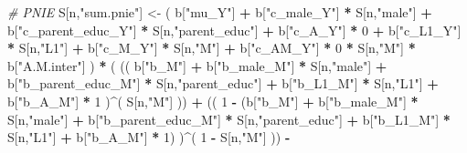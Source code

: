 \documentclass[
]{book}
\newenvironment{Shaded}{\begin{snugshade}}{\end{snugshade}}
\newcommand{\CommentTok}[1]{\textcolor[rgb]{0.56,0.35,0.01}{\textit{#1}}}
\newcommand{\DecValTok}[1]{\textcolor[rgb]{0.00,0.00,0.81}{#1}}
\newcommand{\NormalTok}[1]{#1}
\newcommand{\OtherTok}[1]{\textcolor[rgb]{0.56,0.35,0.01}{#1}}
\newcommand{\SpecialCharTok}[1]{\textcolor[rgb]{0.81,0.36,0.00}{\textbf{#1}}}
\newcommand{\StringTok}[1]{\textcolor[rgb]{0.31,0.60,0.02}{#1}}
\begin{document}
\begin{Shaded}
\begin{Highlighting}[]
    \CommentTok{\# PNIE }
\NormalTok{    S[n,}\StringTok{"sum.pnie"}\NormalTok{] }\OtherTok{\textless{}{-}}\NormalTok{ ( b[}\StringTok{"mu\_Y"}\NormalTok{] }\SpecialCharTok{+} 
\NormalTok{                           b[}\StringTok{"c\_male\_Y"}\NormalTok{] }\SpecialCharTok{*}\NormalTok{ S[n,}\StringTok{"male"}\NormalTok{] }\SpecialCharTok{+} 
\NormalTok{                           b[}\StringTok{"c\_parent\_educ\_Y"}\NormalTok{] }\SpecialCharTok{*}\NormalTok{ S[n,}\StringTok{"parent\_educ"}\NormalTok{] }\SpecialCharTok{+} 
\NormalTok{                           b[}\StringTok{"c\_A\_Y"}\NormalTok{] }\SpecialCharTok{*} \DecValTok{0} \SpecialCharTok{+} 
\NormalTok{                           b[}\StringTok{"c\_L1\_Y"}\NormalTok{] }\SpecialCharTok{*}\NormalTok{ S[n,}\StringTok{"L1"}\NormalTok{] }\SpecialCharTok{+}
\NormalTok{                           b[}\StringTok{"c\_M\_Y"}\NormalTok{] }\SpecialCharTok{*}\NormalTok{ S[n,}\StringTok{"M"}\NormalTok{] }\SpecialCharTok{+}
\NormalTok{                           b[}\StringTok{"c\_AM\_Y"}\NormalTok{] }\SpecialCharTok{*} \DecValTok{0} \SpecialCharTok{*}\NormalTok{ S[n,}\StringTok{"M"}\NormalTok{] }\SpecialCharTok{*}\NormalTok{ b[}\StringTok{"A.M.inter"}\NormalTok{] ) }\SpecialCharTok{*}
\NormalTok{      ( (( b[}\StringTok{"b\_M"}\NormalTok{] }\SpecialCharTok{+} 
\NormalTok{             b[}\StringTok{"b\_male\_M"}\NormalTok{] }\SpecialCharTok{*}\NormalTok{ S[n,}\StringTok{"male"}\NormalTok{] }\SpecialCharTok{+} 
\NormalTok{             b[}\StringTok{"b\_parent\_educ\_M"}\NormalTok{] }\SpecialCharTok{*}\NormalTok{ S[n,}\StringTok{"parent\_educ"}\NormalTok{] }\SpecialCharTok{+} 
\NormalTok{             b[}\StringTok{"b\_L1\_M"}\NormalTok{] }\SpecialCharTok{*}\NormalTok{ S[n,}\StringTok{"L1"}\NormalTok{] }\SpecialCharTok{+}
\NormalTok{             b[}\StringTok{"b\_A\_M"}\NormalTok{] }\SpecialCharTok{*} \DecValTok{1}\NormalTok{ )}\SpecialCharTok{\^{}}\NormalTok{( S[n,}\StringTok{"M"}\NormalTok{] )) }\SpecialCharTok{+}
\NormalTok{          (( }\DecValTok{1} \SpecialCharTok{{-}}\NormalTok{ (b[}\StringTok{"b\_M"}\NormalTok{] }\SpecialCharTok{+} 
\NormalTok{                    b[}\StringTok{"b\_male\_M"}\NormalTok{] }\SpecialCharTok{*}\NormalTok{ S[n,}\StringTok{"male"}\NormalTok{] }\SpecialCharTok{+} 
\NormalTok{                    b[}\StringTok{"b\_parent\_educ\_M"}\NormalTok{] }\SpecialCharTok{*}\NormalTok{ S[n,}\StringTok{"parent\_educ"}\NormalTok{] }\SpecialCharTok{+} 
\NormalTok{                    b[}\StringTok{"b\_L1\_M"}\NormalTok{] }\SpecialCharTok{*}\NormalTok{ S[n,}\StringTok{"L1"}\NormalTok{] }\SpecialCharTok{+}
\NormalTok{                    b[}\StringTok{"b\_A\_M"}\NormalTok{] }\SpecialCharTok{*} \DecValTok{1}\NormalTok{) )}\SpecialCharTok{\^{}}\NormalTok{( }\DecValTok{1} \SpecialCharTok{{-}}\NormalTok{ S[n,}\StringTok{"M"}\NormalTok{] )) }\SpecialCharTok{{-}}

\end{Highlighting}
\end{Shaded}
\end{document}
